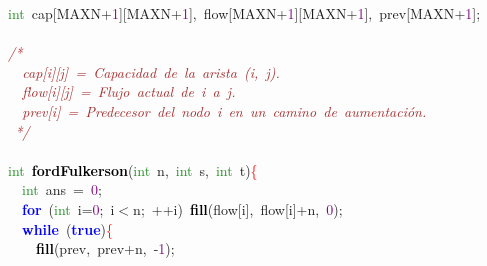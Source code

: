 
{\ttfamily \raggedright {
\noindent
\mbox{}\textcolor{ForestGreen}{int}\ cap\textcolor{BrickRed}{[}MAXN\textcolor{BrickRed}{+}\textcolor{Purple}{1}\textcolor{BrickRed}{][}MAXN\textcolor{BrickRed}{+}\textcolor{Purple}{1}\textcolor{BrickRed}{],}\ flow\textcolor{BrickRed}{[}MAXN\textcolor{BrickRed}{+}\textcolor{Purple}{1}\textcolor{BrickRed}{][}MAXN\textcolor{BrickRed}{+}\textcolor{Purple}{1}\textcolor{BrickRed}{],}\ prev\textcolor{BrickRed}{[}MAXN\textcolor{BrickRed}{+}\textcolor{Purple}{1}\textcolor{BrickRed}{];} \\
\mbox{} \\
\mbox{}\textit{\textcolor{Brown}{/*}} \\
\mbox{}\textit{\textcolor{Brown}{\ \ cap[i][j]\ =\ Capacidad\ de\ la\ arista\ (i,\ j).}} \\
\mbox{}\textit{\textcolor{Brown}{\ \ flow[i][j]\ =\ Flujo\ actual\ de\ i\ a\ j.}} \\
\mbox{}\textit{\textcolor{Brown}{\ \ prev[i]\ =\ Predecesor\ del\ nodo\ i\ en\ un\ camino\ de\ aumentación.}} \\
\mbox{}\textit{\textcolor{Brown}{\ */}} \\
\mbox{} \\
\mbox{}\textcolor{ForestGreen}{int}\ \textbf{\textcolor{Black}{fordFulkerson}}\textcolor{BrickRed}{(}\textcolor{ForestGreen}{int}\ n\textcolor{BrickRed}{,}\ \textcolor{ForestGreen}{int}\ s\textcolor{BrickRed}{,}\ \textcolor{ForestGreen}{int}\ t\textcolor{BrickRed}{)}\textcolor{Red}{\{} \\
\mbox{}\ \ \textcolor{ForestGreen}{int}\ ans\ \textcolor{BrickRed}{=}\ \textcolor{Purple}{0}\textcolor{BrickRed}{;} \\
\mbox{}\ \ \textbf{\textcolor{Blue}{for}}\ \textcolor{BrickRed}{(}\textcolor{ForestGreen}{int}\ i\textcolor{BrickRed}{=}\textcolor{Purple}{0}\textcolor{BrickRed}{;}\ i\textcolor{BrickRed}{$<$}n\textcolor{BrickRed}{;}\ \textcolor{BrickRed}{++}i\textcolor{BrickRed}{)}\ \textbf{\textcolor{Black}{fill}}\textcolor{BrickRed}{(}flow\textcolor{BrickRed}{[}i\textcolor{BrickRed}{],}\ flow\textcolor{BrickRed}{[}i\textcolor{BrickRed}{]+}n\textcolor{BrickRed}{,}\ \textcolor{Purple}{0}\textcolor{BrickRed}{);} \\
\mbox{}\ \ \textbf{\textcolor{Blue}{while}}\ \textcolor{BrickRed}{(}\textbf{\textcolor{Blue}{true}}\textcolor{BrickRed}{)}\textcolor{Red}{\{} \\
\mbox{}\ \ \ \ \textbf{\textcolor{Black}{fill}}\textcolor{BrickRed}{(}prev\textcolor{BrickRed}{,}\ prev\textcolor{BrickRed}{+}n\textcolor{BrickRed}{,}\ \textcolor{BrickRed}{-}\textcolor{Purple}{1}\textcolor{BrickRed}{);} \\
}}
